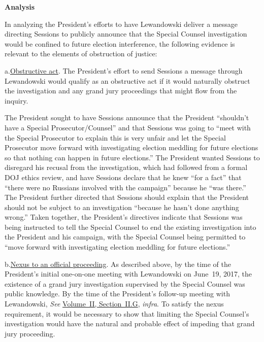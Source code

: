\begin{center}
\textbf{Analysis}
\end{center}

In analyzing the President's efforts to have Lewandowski deliver a message directing Sessions to publicly announce that the Special Counsel investigation would be confined to future election interference, the following evidence is relevant to the elements of obstruction of justice:

a.\qquad\underline{Obstructive act}.
The President's effort to send Sessions a message through Lewandowski would qualify as an obstructive act if it would naturally obstruct the investigation and any grand jury proceedings that might flow from the inquiry.

The President sought to have Sessions announce that the President ``shouldn't have a Special Prosecutor/Counsel'' and that Sessions was going to ``meet with the Special Prosecutor to explain this is very unfair and let the Special Prosecutor move forward with investigating election meddling for future elections so that nothing can happen in future elections.''
The President wanted Sessions to disregard his recusal from the investigation, which had followed from a formal DOJ ethics review, and have Sessions declare that he knew ``for a fact'' that ``there were no Russians involved with the campaign'' because he ``was there.''
The President further directed that Sessions should explain that the President should not be subject to an investigation ``because he hasn't done anything wrong.''
Taken together, the President's directives indicate that Sessions was being instructed to tell the Special Counsel to end the existing investigation into the President and his campaign, with the Special Counsel being permitted to ``move forward with investigating election meddling for future elections.''

b.\qquad\underline{Nexus to an official proceeding}.
As described above, by the time of the President's initial one-on-one meeting with Lewandowski on June~19, 2017, the existence of a grand jury investigation supervised by the Special Counsel was public knowledge.
By the time of the President's follow-up meeting with Lewandowski, 
\textit{See} \hyperlink{subsection.2.2.7}{Volume~II, Section~II.G}, \textit{infra}.
To satisfy the nexus requirement, it would be necessary to show that limiting the Special Counsel's investigation would have the natural and probable effect of impeding that grand jury proceeding.

